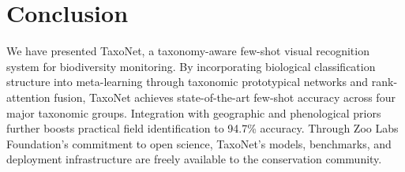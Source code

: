 \section{Conclusion}

\label{sec:conclusion}

We have presented TaxoNet, a taxonomy-aware few-shot visual recognition
system for biodiversity monitoring. By incorporating biological
classification structure into meta-learning through taxonomic prototypical
networks and rank-attention fusion, TaxoNet achieves state-of-the-art
few-shot accuracy across four major taxonomic groups. Integration with
geographic and phenological priors further boosts practical field
identification to 94.7\% accuracy. Through Zoo Labs Foundation's
commitment to open science, TaxoNet's models, benchmarks, and deployment
infrastructure are freely available to the conservation community.




